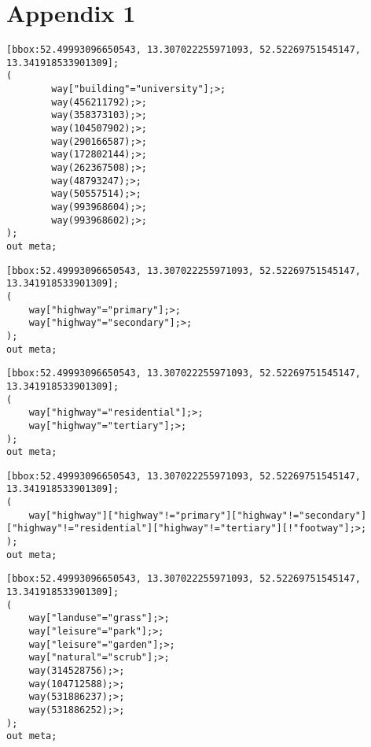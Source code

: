 \chapter{Appendix 1}
\label{appendix:listing1}

\lstset{language=SQL}
\begin{lstlisting}[caption={Overpass Turbo query for all of TU Berlin's buildings}, label={buildings}]
[bbox:52.49993096650543, 13.307022255971093, 52.52269751545147, 13.341918533901309];
(
        way["building"="university"];>;
        way(456211792);>;
        way(358373103);>;
        way(104507902);>;
        way(290166587);>;
        way(172802144);>;
        way(262367508);>;
        way(48793247);>;
        way(50557514);>;
        way(993968604);>;
        way(993968602);>;
);
out meta;
\end{lstlisting}

\begin{lstlisting}[caption={Overpass Turbo query for all main roads next to the campus}, label={main_roads}]
[bbox:52.49993096650543, 13.307022255971093, 52.52269751545147, 13.341918533901309];
(
    way["highway"="primary"];>;
    way["highway"="secondary"];>;
);
out meta;
\end{lstlisting}

\begin{lstlisting}[caption={Overpass Turbo query for all small roads next to the campus}, label={small_roads}]
[bbox:52.49993096650543, 13.307022255971093, 52.52269751545147, 13.341918533901309];
(
    way["highway"="residential"];>;
    way["highway"="tertiary"];>;
);
out meta;
\end{lstlisting}

\begin{lstlisting}[caption={Overpass Turbo query for all pathways and sidewalks next to the campus}, label={pathways}]
[bbox:52.49993096650543, 13.307022255971093, 52.52269751545147, 13.341918533901309];
(
    way["highway"]["highway"!="primary"]["highway"!="secondary"]["highway"!="residential"]["highway"!="tertiary"][!"footway"];>;
);
out meta;
\end{lstlisting}

\begin{lstlisting}[caption={Overpass Turbo query for all water green next to the campus}, label={green_areas}]
[bbox:52.49993096650543, 13.307022255971093, 52.52269751545147, 13.341918533901309];
(
    way["landuse"="grass"];>; 
    way["leisure"="park"];>;
    way["leisure"="garden"];>; 
    way["natural"="scrub"];>; 
    way(314528756);>; 
    way(104712588);>;
    way(531886237);>;
    way(531886252);>;
);
out meta;
\end{lstlisting}

